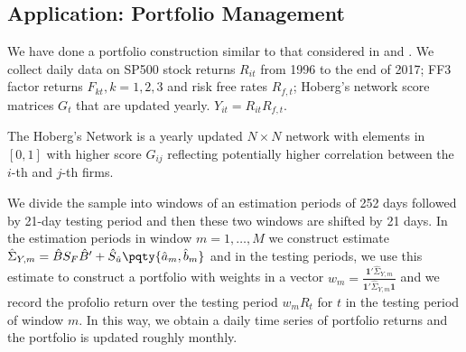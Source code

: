 \subsection{Application: Portfolio Management}

We have done a portfolio construction similar to that considered in \cite{ledoit2004HoneyShrunk} and \cite{ledoit2017NonlinearShrinkage}. We collect daily data on SP500 stock returns \(R_{it}\) from 1996 to the end of 2017; FF3 factor returns \(F_{kt}, k =1,2,3\) and risk free rates \(R_{f,t}\); Hoberg's network score matrices \(G_{t}\) that are updated yearly. \(Y_{it} = R_{it} R_{f,t}\). 

The Hoberg's Network is a yearly updated \(N\times N\) network with elements in \([0,1]\) with higher score \(G_{ij}\) reflecting potentially higher correlation between the \(i\)-th and \(j\)-th firms.

We divide the sample into windows of an estimation periods of 252 days followed by 21-day testing period and then these two windows are shifted by 21 days. In the estimation periods in window  \(m= 1, \dots,M\) we construct estimate \(\hat{\Sigma}_{Y,m} = \hat{B}S_{F}\hat{B}' + \hat{S}_{\hat{u}}\pqty{\hat{a}_{m}, \hat{b}_{m}}\) and in the testing periods, we use this estimate to construct a portfolio with weights in a vector \(w_{m} = \frac{\mathbf{1}' \hat{\Sigma}_{Y,m}}{ \mathbf{1}' \hat{\Sigma}_{Y,m} \mathbf{1}}\) and we record the profolio return over the testing period \(w_{m}R_{t}\) for \(t\) in the testing period of window \(m\). In this way, we obtain a daily time series of portfolio returns and the portfolio is updated roughly monthly. 





